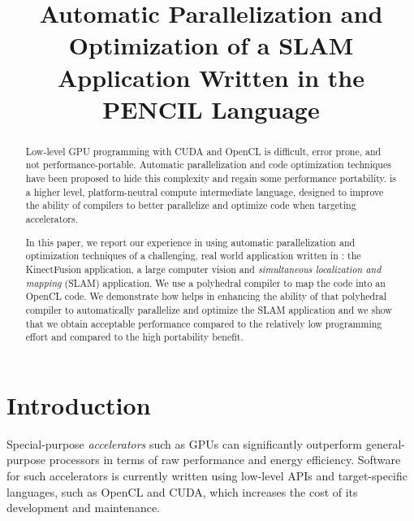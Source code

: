 \documentclass{llncs}
\begin{document}
%
\frontmatter          %
\pagestyle{headings}  %
\mainmatter           %
%
\title{Automatic Parallelization and Optimization of a
	SLAM Application Written in the PENCIL Language}

%
\author{}


\maketitle{}

\begin{abstract}
  Low-level GPU programming with CUDA and OpenCL is difficult, error
  prone, and not performance-portable. Automatic parallelization
  and code optimization techniques have been proposed
  to hide this complexity and regain some performance portability.
  \pencil{} is a higher level, platform-neutral compute intermediate
  language, designed to improve the ability of compilers to better
  parallelize and optimize code when targeting accelerators.

  In this paper, we report our experience in using automatic
  parallelization and optimization techniques of a challenging,
  real world application written in \pencil{}:
  the KinectFusion application, a large computer
  vision and \textit{simultaneous localization and mapping} (SLAM)
  application.
  We use a polyhedral compiler to map the \pencil{} code into
  an OpenCL code.
  We demonstrate how \pencil{} helps in enhancing the ability of
  that polyhedral compiler to automatically parallelize and optimize
  the SLAM application and we show that we obtain acceptable performance
  compared to the relatively low programming effort and compared to
  the high portability benefit.
\end{abstract}

\section{Introduction}

Special-purpose \emph{accelerators} such as GPUs can significantly
outperform general-purpose processors in terms of raw performance and
energy efficiency.  Software for such accelerators is currently
written using low-level APIs and target-specific languages, such as
OpenCL and CUDA, which increases the cost of its development and
maintenance.
\end{document}
